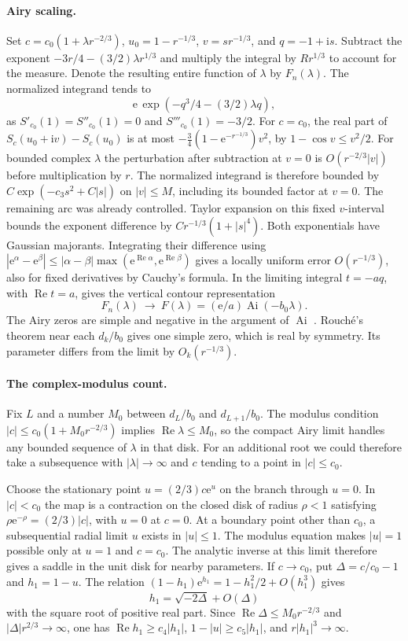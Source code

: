 \documentclass[11pt]{article}
\DeclareMathOperator{\Ai}{Ai}
\DeclareMathOperator{\Rea}{Re}
\newcommand{\ee}{\mathrm e}
\newcommand{\ii}{\mathrm i}
\begin{document}
\paragraph{Airy scaling.}
Set \(c=c_0(1+\lambda r^{-2/3})\), \(u_0=1-r^{-1/3}\), \(v=s r^{-1/3}\), and \(q=-1+\ii s\). Subtract the exponent \(-3r/4-(3/2)\lambda r^{1/3}\) and multiply the integral by \(Rr^{1/3}\) to account for the measure. Denote the resulting entire function of \(\lambda\) by \(F_n(\lambda)\). The normalized integrand tends to
\[
 \ee\,\exp(-q^3/4-(3/2)\lambda q),
\]
as \(S'_{c_0}(1)=S''_{c_0}(1)=0\) and \(S'''_{c_0}(1)=-3/2\). For \(c=c_0\), the real part of \(S_c(u_0+\ii v)-S_c(u_0)\) is at most \(-\tfrac34(1-\ee^{-r^{-1/3}})v^2\), by \(1-\cos v\le v^2/2\). For bounded complex \(\lambda\) the perturbation after subtraction at \(v=0\) is \(O(r^{-2/3}|v|)\) before multiplication by \(r\). The normalized integrand is therefore bounded by \(C\exp(-c_3s^2+C|s|)\) on \(|v|\le M\), including its bounded factor at \(v=0\). The remaining arc was already controlled. Taylor expansion on this fixed \(v\)-interval bounds the exponent difference by \(C r^{-1/3}(1+|s|^4)\). Both exponentials have Gaussian majorants. Integrating their difference using
\(|\ee^\alpha-\ee^\beta|\le|\alpha-\beta|\max(\ee^{\Rea\alpha},\ee^{\Rea\beta})\)
gives a locally uniform error \(O(r^{-1/3})\), also for fixed derivatives by Cauchy's formula. In the limiting integral \(t=-a q\), with \(\Rea t=a\), gives the vertical contour representation \cite[Sec.~9.5]{dlmf}
\[
 F_n(\lambda)\ \longrightarrow\ F(\lambda)=(\ee/a)\Ai(-b_0\lambda).
\]
The Airy zeros are simple and negative in the argument of \(\Ai\) \cite[Sec.~9.9]{dlmf}. Rouché's theorem near each \(d_k/b_0\) gives one simple zero, which is real by symmetry. Its parameter differs from the limit by \(O_k(r^{-1/3})\).

\paragraph{The complex-modulus count.}
Fix \(L\) and a number \(M_0\) between \(d_L/b_0\) and \(d_{L+1}/b_0\). The modulus condition \(|c|\le c_0(1+M_0 r^{-2/3})\) implies \(\Rea\lambda\le M_0\), so the compact Airy limit handles any bounded sequence of \(\lambda\) in that disk. For an additional root we could therefore take a subsequence with \(|\lambda|\to\infty\) and \(c\) tending to a point in \(|c|\le c_0\).

Choose the stationary point \(u=(2/3)c\ee^u\) on the branch through \(u=0\). In \(|c|<c_0\) the map is a contraction on the closed disk of radius \(\rho<1\) satisfying \(\rho\ee^{-\rho}=(2/3)|c|\), with \(u=0\) at \(c=0\). At a boundary point other than \(c_0\), a subsequential radial limit \(u\) exists in \(|u|\le1\). The modulus equation makes \(|u|=1\) possible only at \(u=1\) and \(c=c_0\). The analytic inverse at this limit therefore gives a saddle in the unit disk for nearby parameters. If \(c\to c_0\), put \(\Delta=c/c_0-1\) and \(h_1=1-u\). The relation \((1-h_1)\ee^{h_1}=1-h_1^2/2+O(h_1^3)\) gives
\[
 h_1=\sqrt{-2\Delta}+O(\Delta)
\]
with the square root of positive real part. Since \(\Rea\Delta\le M_0 r^{-2/3}\) and \(|\Delta|r^{2/3}\to\infty\), one has \(\Rea h_1\ge c_4|h_1|\), \(1-|u|\ge c_5|h_1|\), and \(r|h_1|^3\to\infty\).
\end{document}
